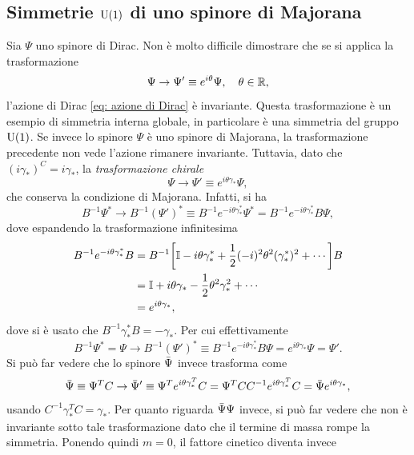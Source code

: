 \subsection{Simmetrie \texorpdfstring{$\mathrm{U}(1)$}{U(1)} di uno spinore di Majorana}
Sia $\Psi$ uno spinore di Dirac. Non è molto difficile dimostrare che se si applica la trasformazione 
\begin{equation}
    \Psi \to \Psi' \equiv e^{i\theta}\Psi,\quad \theta \in \mathbb{R},
\end{equation}
l'azione di Dirac \eqref{eq: azione di Dirac} è invariante. Questa trasformazione è un esempio di simmetria interna globale, in particolare è una simmetria del gruppo $\mathrm{U}(1)$. Se invece lo spinore $\Psi$ è uno spinore di Majorana, la trasformazione precedente non vede l'azione rimanere invariante. Tuttavia, dato che $(i\gamma_*)^C = i\gamma_*$, la \emph{trasformazione chirale}
\begin{equation}
    \Psi \to \Psi' \equiv e^{i\theta\gamma_*}\Psi,
\end{equation}
che conserva la condizione di Majorana. Infatti, si ha
\begin{equation}
    B^{-1}\Psi^* \to B^{-1}(\Psi')^* \equiv B^{-1}e^{-i\theta\gamma_*^*}\Psi^* = B^{-1}e^{-i\theta\gamma_*^*}B\Psi,
\end{equation}
dove espandendo la trasformazione infinitesima 
\begin{equation}
    \begin{split}
        B^{-1}e^{-i\theta\gamma_*^*}B &= B^{-1}\bigg[\mathbb{I} - i\theta\gamma_*^* + \frac{1}{2}(-i)^2\theta^2(\gamma_*^*)^2 + \cdots\bigg]B \\
        &= \mathbb{I} + i\theta\gamma_* - \frac{1}{2}\theta^2\gamma_*^2 + \cdots \\
        &= e^{i\theta\gamma_*},
    \end{split}
\end{equation}
dove si è usato che $B^{-1}\gamma_*^*B = -\gamma_*$. Per cui effettivamente
\begin{equation}
    B^{-1}\Psi^* = \Psi \to B^{-1}(\Psi')^* \equiv B^{-1}e^{-i\theta\gamma_*^*}B\Psi = e^{i\theta\gamma_*}\Psi = \Psi'.
\end{equation}
Si può far vedere che lo spinore $\bar{\Psi}$ invece trasforma come 
\begin{equation}
    \bar{\Psi} \equiv \Psi^TC \to \bar{\Psi}' \equiv \Psi^Te^{i\theta\gamma_*^T}C = \Psi^TCC^{-1}e^{i\theta\gamma_*^T}C = \bar{\Psi}e^{i\theta\gamma_*},
\end{equation}
usando $C^{-1}\gamma_*^TC = \gamma_*$. Per quanto riguarda $\bar{\Psi}\Psi$ invece, si può far vedere che non è invariante sotto tale trasformazione dato che il termine di massa rompe la simmetria. Ponendo quindi $m = 0$, il fattore cinetico diventa invece
